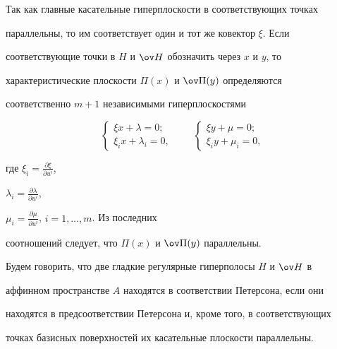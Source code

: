 \begin{pf} 


Так как главные касательные гиперплоскости в соответствующих точках 


параллельны, то им соответствует один и тот же ковектор $\xi$. Если 


соответствующие точки в $H$ и $\ov H$ обозначить через $x$ и $y$, то 


характеристические плоскости $\Pi(x)$ и $\ov\Pi(y)$ определяются 


соответственно $m+1$ независимыми гиперплоскостями 


$$ 


\begin{cases} 


\xi x+\lambda=0; \\ \xi_i x+\lambda_i=0,  


\end{cases} 


\qquad 


\begin{cases} 


\xi y+\mu=0; \\ \xi_i y+\mu_i=0, 


\end{cases} 


$$ 


где $\xi_i=\frac{\partial\xi}{\partial u^i}$, 


$\lambda_i=\frac{\partial\lambda}{\partial u^i}$, 


$\mu_i=\frac{\partial\mu}{\partial u^i}$, $i=1,\dotsc,m$. Из последних 


соотношений следует, что $\Pi(x)$ и $\ov\Pi(y)$ параллельны. 


\end{pf} 


 


\begin{defn} 


Будем говорить, что две гладкие регулярные гиперполосы $H$ и $\ov H$ в 


аффинном пространстве $A$ находятся в соответствии Петерсона, если они 


находятся в предсоответствии Петерсона и, кроме того, в соответствующих 


точках базисных поверхностей их касательные плоскости параллельны. 


\end{defn} 


